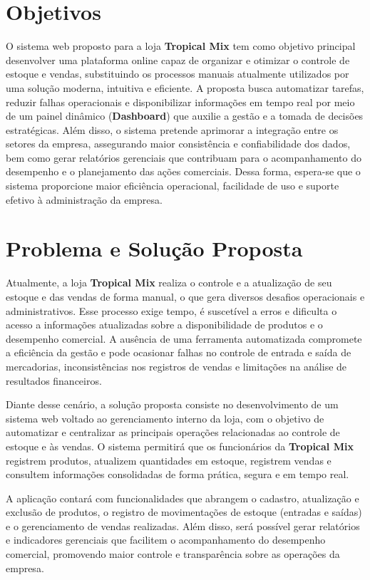 \section{Objetivos}

O sistema web proposto para a loja \textbf{Tropical Mix} tem como objetivo principal desenvolver uma plataforma online capaz de organizar e otimizar o controle de estoque e vendas, substituindo os processos manuais atualmente utilizados por uma solução moderna, intuitiva e eficiente. A proposta busca automatizar tarefas, reduzir falhas operacionais e disponibilizar informações em tempo real por meio de um painel dinâmico (\textbf{Dashboard}) que auxilie a gestão e a tomada de decisões estratégicas. Além disso, o sistema pretende aprimorar a integração entre os setores da empresa, assegurando maior consistência e confiabilidade dos dados, bem como gerar relatórios gerenciais que contribuam para o acompanhamento do desempenho e o planejamento das ações comerciais. Dessa forma, espera-se que o sistema proporcione maior eficiência operacional, facilidade de uso e suporte efetivo à administração da empresa.

\section{Problema e Solução Proposta}

Atualmente, a loja \textbf{Tropical Mix} realiza o controle e a atualização de seu estoque e das vendas de forma manual, o que gera diversos desafios operacionais e administrativos. Esse processo exige tempo, é suscetível a erros e dificulta o acesso a informações atualizadas sobre a disponibilidade de produtos e o desempenho comercial. A ausência de uma ferramenta automatizada compromete a eficiência da gestão e pode ocasionar falhas no controle de entrada e saída de mercadorias, inconsistências nos registros de vendas e limitações na análise de resultados financeiros.

Diante desse cenário, a solução proposta consiste no desenvolvimento de um sistema web voltado ao gerenciamento interno da loja, com o objetivo de automatizar e centralizar as principais operações relacionadas ao controle de estoque e às vendas. O sistema permitirá que os funcionários da \textbf{Tropical Mix} registrem produtos, atualizem quantidades em estoque, registrem vendas e consultem informações consolidadas de forma prática, segura e em tempo real.

A aplicação contará com funcionalidades que abrangem o cadastro, atualização e exclusão de produtos, o registro de movimentações de estoque (entradas e saídas) e o gerenciamento de vendas realizadas. Além disso, será possível gerar relatórios e indicadores gerenciais que facilitem o acompanhamento do desempenho comercial, promovendo maior controle e transparência sobre as operações da empresa.

